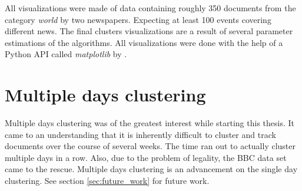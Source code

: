 All visualizations were made of data containing roughly 350 documents from the category \emph{world} by two newspapers. Expecting at least 100 events covering different news. The final clusters visualizations are a result of several parameter estimations of the algorithms. All visualizations were done with the help of a Python API called \emph{matplotlib} by \cite{MatPlotHunter2007}.

\section{Multiple days clustering}
  Multiple days clustering was of the greatest interest while starting this thesis. It came to an understanding that it is inherently difficult to cluster and track documents over the course of several weeks. The time ran out to actually cluster multiple days in a row. Also, due to the problem of legality, the BBC data set came to the rescue. Multiple days clustering is an advancement on the single day clustering. See section \ref{sec:future_work} for future work.




